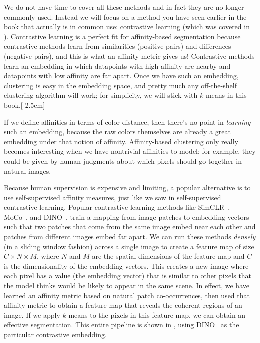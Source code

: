 We do not have time to cover all these methods and in fact they are no longer commonly used. Instead we will focus on a method you have seen earlier in the book that actually is in common use: contrastive learning (which was covered in \sect{\ref{sec:representation_learning:contrastive_learning}}). Contrastive learning is a perfect fit for affinity-based segmentation because contrastive methods learn from similarities (positive pairs) and differences (negative pairs), and this is what an affinity metric gives us! Contrastive methods learn an embedding in which datapoints with high affinity are nearby and datapoints with low affinity are far apart. Once we have such an embedding, clustering is easy in the embedding space, and pretty much any off-the-shelf clustering algorithm will work; for simplicity, we will stick with $k$-means in this book.[-2.5cm]

If we define affinities in terms of color distance, then there's no point in \textit{learning} such an embedding, because the raw colors themselves are already a great embedding under that notion of affinity. Affinity-based clustering only really becomes interesting when we have nontrivial affinities to model; for example, they could be given by human judgments about which pixels should go together in natural images.

Because human supervision is expensive and limiting, a popular alternative is to use self-supervised affinity measures, just like we saw in self-supervised contrastive learning. Popular contrastive learning methods like SimCLR~\cite{chen2020simple}, MoCo~\cite{he2020momentum}, and DINO~\cite{caron2021emerging}, train a mapping from image patches to embedding vectors such that two patches that come from the same image embed near each other and patches from different images embed far apart. We can run these methods \textit{densely} (in a sliding window fashion) across a single image to create a feature map of size $C \times N \times M$, where $N$ and $M$ are the spatial dimensions of the feature map and $C$ is the dimensionality of the embedding vectors. This creates a new image where each pixel has a value (the embedding vector) that is similar to other pixels that the model thinks would be likely to appear in the same scene. In effect, we have learned an affinity metric based on natural patch co-occurrences, then used that affinity metric to obtain a feature map that reveals the coherent regions of an image. If we apply $k$-means to the pixels in this feature map, we can obtain an effective segmentation. This entire pipeline is shown in \fig{\ref{fig:perceptual_organization:kmeans_dino}}, using DINO~\cite{caron2021emerging} as the particular contrastive embedding.

